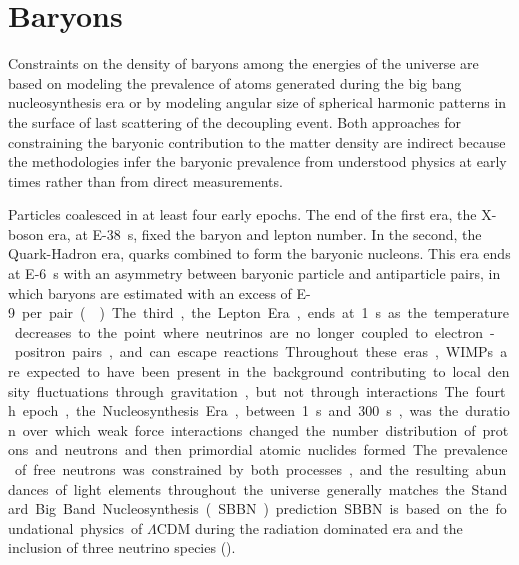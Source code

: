 \documentclass{paper}
\begin{document}
\section{Baryons}
  Constraints on the density of baryons among the energies of the universe are
  based on modeling the prevalence of atoms generated during the big bang 
  nucleosynthesis era or by modeling angular size of spherical harmonic 
  patterns in the surface of last scattering of the decoupling event. Both 
  approaches for constraining the baryonic contribution to the matter density 
  are indirect because the methodologies infer the baryonic prevalence from 
  understood physics at early times rather than from direct measurements.


  Particles coalesced in at least four early epochs. The end of the first era,
  the X-boson era, at \SI{E-38}{s}, fixed the baryon and lepton number. 
  In the second, the Quark-Hadron era, quarks combined to form the baryonic 
  nucleons. This era ends at \SI{E-6}{s} with an asymmetry between baryonic
  particle and antiparticle pairs, in which baryons are estimated with an 
  excess of \SI{E-9} per pair (\cite{1993PhRvL..70.2833F}). The third, the 
  Lepton Era, ends at \SI{1}{s} as the temperature decreases to the point 
  where neutrinos are no longer coupled to electron-positron pairs, and can 
  escape reactions. Throughout these eras, WIMPs are expected to have been 
  present in the background contributing to local density fluctuations 
  through gravitation, but not through interactions.

  The fourth epoch, the Nucleosynthesis Era, between \SI{1}{s} and 
  \SI{300}{s}, was the duration over which weak force interactions changed
  the number distribution of protons and neutrons and then primordial atomic 
  nuclides formed. The prevalence of free neutrons was constrained by both
  processes, and the resulting abundances of light elements throughout the 
  universe generally matches the Standard Big Band Nucleosynthesis (SBBN)
  prediction. SBBN is based on the foundational physics of $\Lambda$CDM 
  during the radiation dominated era and the inclusion of three neutrino 
  species (\cite{Cyburt_2016}). 
\end{document}
